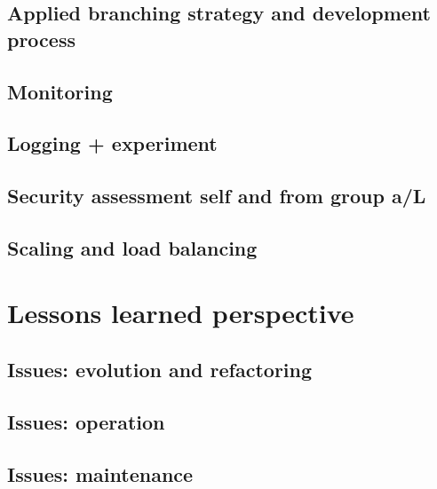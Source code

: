 \documentclass{article}
\newcommand{\quickcharcount}[1]{%
  \immediate\write18{texcount -1 -sum -merge -char #1.tex > #1-chars.sum}%
  \openin\tmp=#1-chars.sum%
  \read\tmp to \thechar%
  \closein\tmp%
}
\newcommand{\quickwordcount}[1]{%
  \immediate\write18{texcount -1 -sum -merge #1.tex > #1-words.sum}%
  \openin\tmp=#1-words.sum%
  \read\tmp to \theword%
  \closein\tmp%
}
\begin{document}
\subsection{Applied branching strategy and development process}
\subsection{Monitoring}
\subsection{Logging + experiment}
\subsection{Security assessment self and from group a/L}
\subsection{Scaling and load balancing}

\section{Lessons learned perspective} \label{section:Lessons learned perspective}
\subsection{Issues: evolution and refactoring}
\subsection{Issues: operation}
\subsection{Issues: maintenance}



\begin{comment}
    \quickwordcount{main}
    \quickcharcount{main}
    \todo{There are \thechar characters and approximately \theword spaces.
    That makes approximately \the\numexpr\theword+\thechar\relax\ characters total.}
\end{comment}
\end{document}
